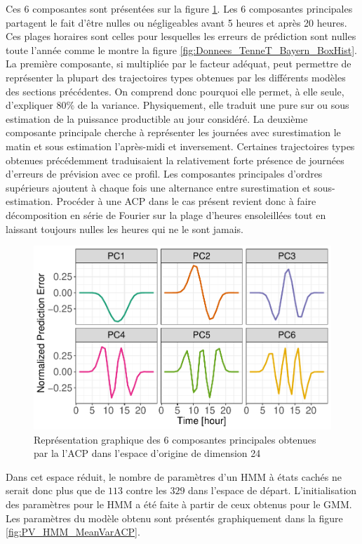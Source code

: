 \documentclass[12pt]{report}
\begin{document}
Ces 6 composantes sont présentées sur la figure \ref{fig:PV_HMM_ACP_PC}. Les 6 composantes principales partagent le fait d'être nulles ou négligeables avant 5 heures et après 20 heures. Ces plages horaires sont celles pour lesquelles les erreurs de prédiction sont nulles toute l'année comme le montre la figure \ref{fig:Donnees_TenneT_Bayern_BoxHist}. La première composante, si multipliée par le facteur adéquat, peut permettre de représenter la plupart des trajectoires types obtenues par les différents modèles des sections précédentes. On comprend donc pourquoi elle permet, à elle seule, d'expliquer $80\%$ de la variance. Physiquement, elle traduit une pure sur ou sous estimation de la puissance productible au jour considéré. La deuxième composante principale cherche à représenter les journées avec surestimation le matin et sous estimation l'après-midi et inversement. Certaines trajectoires types obtenues précédemment traduisaient la relativement forte présence de journées d'erreurs de prévision avec ce profil. Les composantes principales d'ordres supérieurs ajoutent à chaque fois une alternance entre surestimation et sous-estimation. Procéder à une ACP dans le cas présent revient donc à faire décomposition en série de Fourier sur la plage d'heures ensoleillées tout en laissant toujours nulles les heures qui ne le sont jamais.

\begin{figure}[htbp]
	\centering
	\includegraphics[width = 0.8 \linewidth]{Images/PV/ACP/ACP_PrincipalComp_6.pdf}
	\caption{Représentation graphique des 6 composantes principales obtenues par la l'ACP dans l'espace d'origine de dimension 24}
	\label{fig:PV_HMM_ACP_PC}
\end{figure}

Dans cet espace réduit, le nombre de paramètres d'un HMM à états cachés ne serait donc plus que de $113$ contre les $329$ dans l'espace de départ. L'initialisation des paramètres pour le HMM a été faite à partir de ceux obtenus pour le GMM. Les paramètres du modèle obtenu sont présentés graphiquement dans la figure \ref{fig:PV_HMM_MeanVarACP}.
\end{document}
